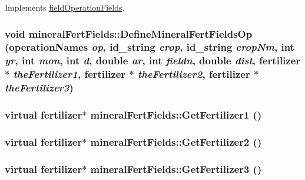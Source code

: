 Implements \hyperlink{classfield_operation_fields_ae5d8585b7e57196ce3801eed29677b3e}{fieldOperationFields}.\hypertarget{classmineral_fert_fields_a0fcabc516dd032435d3758a059a1c0f9}{
\subsubsection[{DefineMineralFertFieldsOp}]{\setlength{\rightskip}{0pt plus 5cm}void mineralFertFields::DefineMineralFertFieldsOp ({\bf operationNames} {\em op}, \/  {\bf id\_\-string} {\em crop}, \/  {\bf id\_\-string} {\em cropNm}, \/  int {\em yr}, \/  int {\em mon}, \/  int {\em d}, \/  double {\em ar}, \/  int {\em fieldn}, \/  double {\em dist}, \/  {\bf fertilizer} $\ast$ {\em theFertilizer1}, \/  {\bf fertilizer} $\ast$ {\em theFertilizer2}, \/  {\bf fertilizer} $\ast$ {\em theFertilizer3})}}
\label{classmineral_fert_fields_a0fcabc516dd032435d3758a059a1c0f9}
\hypertarget{classmineral_fert_fields_a3a79f76ebce8738baa828a0b11db1f54}{
\subsubsection[{GetFertilizer1}]{\setlength{\rightskip}{0pt plus 5cm}virtual {\bf fertilizer}$\ast$ mineralFertFields::GetFertilizer1 ()}}
\label{classmineral_fert_fields_a3a79f76ebce8738baa828a0b11db1f54}
\hypertarget{classmineral_fert_fields_a5c793240c6b803ab87c19d0be3513ea5}{
\subsubsection[{GetFertilizer2}]{\setlength{\rightskip}{0pt plus 5cm}virtual {\bf fertilizer}$\ast$ mineralFertFields::GetFertilizer2 ()}}
\label{classmineral_fert_fields_a5c793240c6b803ab87c19d0be3513ea5}
\hypertarget{classmineral_fert_fields_a312491a593ff9258446d24704d833f5b}{
\subsubsection[{GetFertilizer3}]{\setlength{\rightskip}{0pt plus 5cm}virtual {\bf fertilizer}$\ast$ mineralFertFields::GetFertilizer3 ()}}
